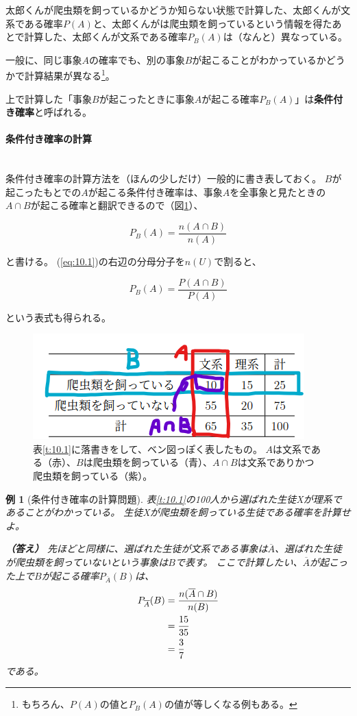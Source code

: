 \documentclass[luatexja,fontsize=12pt]{jlreq}\usepackage{ifthen}\newcounter{enlarge}\setcounter{enlarge}{1}
\newcommand{\eqbox}[1]{\begin{oframed} {#1} \end{oframed} \noindent} %
\newtheorem{eg}{例}
\begin{document}
太郎くんが爬虫類を飼っているかどうか知らない状態で計算した、太郎くんが文系である確率$P(A)$と、太郎くんがは爬虫類を飼っているという情報を得たあとで計算した、太郎くんが文系である確率$P_B (A)$は（なんと）異なっている。

一般に、同じ事象$A$の確率でも、別の事象$B$が起こることがわかっているかどうかで計算結果が異なる\footnote{%
もちろん、$P(A)$の値と$P_B (A)$の値が等しくなる例もある。}。

上で計算した「事象$B$が起こったときに事象$A$が起こる確率$P_B (A)$」は\textbf{条件付き確率}と呼ばれる。
\mbox{}\\

\paragraph{条件付き確率の計算}\mbox{}\\
\noindent
条件付き確率の計算方法を（ほんの少しだけ）一般的に書き表しておく。
$B$が起こったもとでの$A$が起こる条件付き確率は、事象$A$を全事象と見たときの$A \cap B$が起こる確率と翻訳できるので（図\ref{f:10.1}）、
\eqbox{%
\begin{equation} \label{eq:10.1}
P_B (A) = \frac{n(A \cap B)}{n(A)}
\end{equation}
}
と書ける。
(\ref{eq:10.1})の右辺の分母分子を$n(U)$で割ると、
\eqbox{%
\begin{equation} \label{eq:10.2}
P_B (A) = \frac{P(A \cap B)}{P(A)}
\end{equation}
}
という表式も得られる。
\begin{figure}[] 
\centering 
\includegraphics[width=10truecm]{f10-1.png}
\captionsetup{width=.9\linewidth}
\caption{%
表\ref{t:10.1}に落書きをして、ベン図っぽく表したもの。
$A$は文系である（赤）、$B$は爬虫類を飼っている（青）、$A \cap B$は文系でありかつ爬虫類を飼っている（紫）。
}
\label{f:10.1}
\end{figure}%

\begin{eg}[条件付き確率の計算問題]
表\ref{t:10.1}の100人から選ばれた生徒Xが理系であることがわかっている。
生徒Xが爬虫類を飼っている生徒である確率を計算せよ。

\textbf{（答え）}
先ほどと同様に、選ばれた生徒が文系である事象は$\overline{A}$、選ばれた生徒が爬虫類を飼っていないという事象は$B$で表す。
ここで計算したい、$\overline{A}$が起こった上で$B$が起こる確率$P_{\overline{A}} (B)$は、
\begin{align}
P_{\overline{A}} (B) &= \frac{n(\overline{A} \cap B)}{n(B)} \notag \\
&= \frac{15}{35} \notag \\
&= \frac{3}{7} \label{eq:10.3}
\end{align}
である。
\end{eg}
\end{document}

